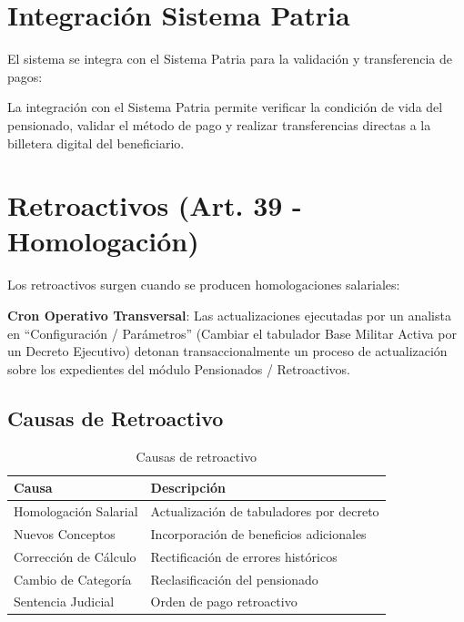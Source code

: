 \section{Integración Sistema Patria}

El sistema se integra con el Sistema Patria para la validación y transferencia de pagos:

\begin{tcolorbox}[
    enhanced,
    colback=sandraSoft,
    colframe=sandraDark,
    width=0.9\textwidth,
    halign=center
]
\small
La integración con el Sistema Patria permite verificar la condición de vida del pensionado, validar el método de pago y realizar transferencias directas a la billetera digital del beneficiario.
\end{tcolorbox}

\section{Retroactivos (Art. 39 - Homologación)}

Los retroactivos surgen cuando se producen homologaciones salariales:

\begin{tcolorbox}[
    enhanced,
    colback=white,
    colframe=sandraAccent,
    width=0.9\textwidth,
    halign=center
]
\small
\textbf{Cron Operativo Transversal}: Las actualizaciones ejecutadas por un analista en ``Configuración / Parámetros'' (Cambiar el tabulador Base Militar Activa por un Decreto Ejecutivo) detonan transaccionalmente un proceso de actualización sobre los expedientes del módulo Pensionados / Retroactivos.
\end{tcolorbox}

\subsection*{Causas de Retroactivo}

\begin{longtable}{p{4cm}p{8cm}}
\toprule
\textbf{Causa} & \textbf{Descripción} \\
\midrule
\endhead
\bottomrule
\caption{Causas de retroactivo}
\label{tab:causas-retroactivo}
\endlastfoot

Homologación Salarial & Actualización de tabuladores por decreto \\
Nuevos Conceptos & Incorporación de beneficios adicionales \\
Corrección de Cálculo & Rectificación de errores históricos \\
Cambio de Categoría & Reclasificación del pensionado \\
Sentencia Judicial & Orden de pago retroactivo \\
\end{longtable}

